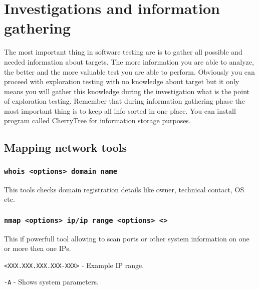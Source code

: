 \documentclass{article}[12pt]
\begin{document}




\section{Investigations and information gathering}
The most important thing in software testing are is to gather all possible and needed information about targets.
The more information you are able to analyze, the better and the more valuable test you are able to perform.
Obviously you can proceed with exploration testing with no knowledge about target but it only means you will gather this knowledge
during the investigation what is the point of exploration testing.
Remember that during information gathering phase the most important thing is to keep all info sorted in one place.
You can install program called CherryTree for information storage purposes.


\subsection{Mapping network tools}

\subsubsection{\texttt{whois <options> domain name}}
This tools checks domain registration details like owner, technical contact, OS etc.

\subsubsection{\texttt{nmap <options> ip/ip range <options> <>}}
This if powerfull tool allowing to scan ports or other system information on one or more then one IPs.
\newline
\newline

\texttt{<XXX.XXX.XXX.XXX-XXX>} - Example IP range.
\newline

\texttt{-A} - Shows system parameters.
\newline
\end{document}
